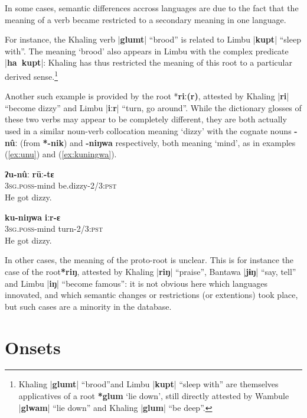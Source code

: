 \documentclass[oldfontcommands,oneside,a4paper,11pt]{article}
\newcommand{\ipa}[1]{\textbf{{\phon\mbox{#1}}}} %
\newcommand{\dhatu}[2]{|\ipa{#1}| ``#2''}
\newcommand{\dhat}[1]{|\ipa{#1}|}
\begin{document}
In some cases, semantic differences accross languages are due to the fact that the meaning of a verb became restricted to a secondary meaning in one language. 

For instance, the Khaling verb \dhatu{glumt}{brood} is related to Limbu \dhatu{kupt}{sleep with}. The meaning `brood' also appears in Limbu with the complex predicate \dhat{ha kupt}: Khaling has thus restricted the meaning of this root to a particular derived sense.\footnote{Khaling \dhatu{glumt}{brood}and Limbu  \dhatu{kupt}{sleep with} are themselves applicatives of a root \ipa{*glum} `lie down', still directly attested by Wambule  \dhatu{glwam}{lie down} and Khaling \dhatu{glum}{be deep}.  }

Another such example is provided by the root *\ipa{riː(r)}, attested by Khaling \dhatu{ri}{become dizzy} and Limbu \dhatu{iːr}{turn, go around}. While the dictionary glosses of these two verbs may appear to be completely different, they are both actually used in a similar noun-verb collocation meaning `dizzy' with the cognate nouns \ipa{-nûː} (from \ipa{*-nik}) and \ipa{-niŋwa} respectively, both meaning `mind', as in examples (\ref{ex:unu}) and (\ref{ex:kuningwa}).

\begin{exe}
\ex \label{ex:unu}
\gll \ipa{ʔu-nûː} \ipa{rūː-tɛ} \\
\textsc{3sg.poss}-mind be.dizzy-\textsc{2/3:pst} \\
\glt He got dizzy.
\end{exe}


\begin{exe}
\ex \label{ex:kuningwa}
\gll \ipa{ku-niŋwa} \ipa{iːr-ɛ} \\
\textsc{3sg.poss}-mind turn-\textsc{2/3:pst} \\
\glt He got dizzy.
\end{exe}

In other cases, the meaning of the proto-root is unclear. This is for instance the case of the root\ipa{*riŋ}, attested by Khaling \dhatu{riŋ}{praise}, Bantawa \dhatu{jɨŋ}{say, tell} and Limbu \dhatu{iŋ}{become famous}: it is not obvious here which languages innovated, and which semantic changes or restrictions (or extentions) took place, but such cases are a minority in the database.

\section{Onsets} \label{sec:onsets}
\end{document}
